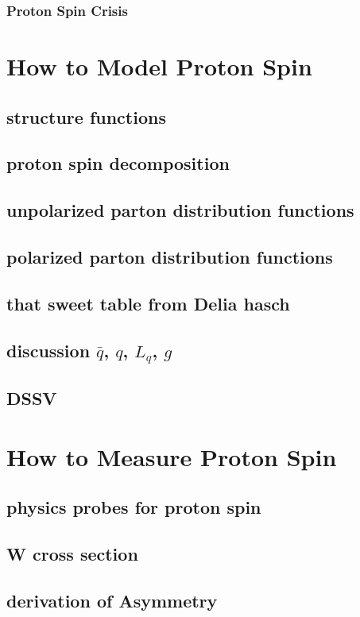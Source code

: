 \subsubsection{Proton Spin Crisis}

\clearpage
\section{How to Model Proton Spin}
\subsection{ structure functions}
\subsection{ proton spin decomposition}
\subsection{ unpolarized parton distribution functions}
\subsection{ polarized parton distribution functions}
\subsection{ that sweet table from Delia hasch}
\subsection{ discussion $\bar{q}$, $q$, $L_q$, $g$}
\subsection{ DSSV }

\clearpage
\section{How to Measure Proton Spin}
\subsection{ physics probes for proton spin}
\subsection{ W cross section}
\subsection{ derivation of Asymmetry}
